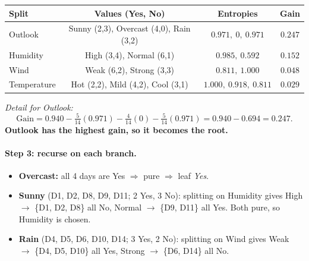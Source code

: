 \begin{center}
\begin{tabular}{@{}lccc@{}}
\toprule
\textbf{Split} & \textbf{Values (Yes, No)} & \textbf{Entropies} & \textbf{Gain}\\
\midrule
Outlook & Sunny (2,3), Overcast (4,0), Rain (3,2) & $0.971,\ 0,\ 0.971$ & $\mathbf{0.247}$\\
Humidity & High (3,4), Normal (6,1) & $0.985,\ 0.592$ & $0.152$\\
Wind & Weak (6,2), Strong (3,3) & $0.811,\ 1.000$ & $0.048$\\
Temperature & Hot (2,2), Mild (4,2), Cool (3,1) & $1.000,\ 0.918,\ 0.811$ & $0.029$\\
\bottomrule
\end{tabular}
\end{center}

\emph{Detail for Outlook:}
\[
\text{Gain}=0.940-\tfrac{5}{14}(0.971)-\tfrac{4}{14}(0)-\tfrac{5}{14}(0.971)=0.940-0.694=0.247 .
\]
\textbf{Outlook has the highest gain, so it becomes the root.}

\paragraph{Step 3: recurse on each branch.}
\begin{itemize}
  \item \textbf{Overcast:} all 4 days are Yes $\Rightarrow$ pure $\Rightarrow$ leaf \emph{Yes}.
  \item \textbf{Sunny} (D1, D2, D8, D9, D11; 2 Yes, 3 No): splitting on Humidity gives High $\to$ \{D1, D2, D8\} all No, Normal $\to$ \{D9, D11\} all Yes. Both pure, so Humidity is chosen.
  \item \textbf{Rain} (D4, D5, D6, D10, D14; 3 Yes, 2 No): splitting on Wind gives Weak $\to$ \{D4, D5, D10\} all Yes, Strong $\to$ \{D6, D14\} all No.
\end{itemize}

